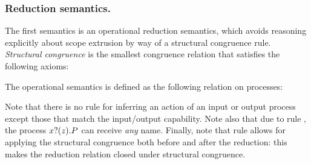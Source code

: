 \documentclass[runningheads]{llncs}
\begin{document}



\subsubsection{Reduction semantics.}
The first semantics is an operational reduction semantics, which avoids reasoning explicitly about scope extrusion by way of a structural congruence rule.
\emph{Structural congruence} is the smallest congruence relation that satisfies the following axioms:


The operational semantics is defined as the following relation on processes:
Note that there is no rule for inferring an action of an input or output process except those that match the input/output capability.
Note also that due to rule , the process \( x ? (z) . P \) can receive \emph{any} name.
Finally, note that rule  allows for applying the structural congruence both before and after the reduction:
this makes the reduction relation closed under structural congruence.
\end{document}
